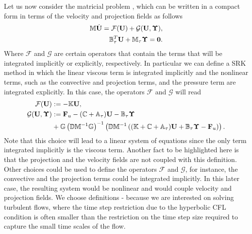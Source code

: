 Let us now consider the matricial problem , which can be written in a compact form in terms of the velocity and projection fields as follows
\begin{subequations}\label{eq-C7_SRK_ueta}
\begin{align}
\label{eq-C7_SRK_u}
\mathbb{M}\dot{{\bf U}}=\mathcal{F}({\bf U})+\mathcal{G}({\bf U},\boldsymbol{\Upsilon}),\\
\label{eq-C7_SRK_eta}
\mathbb{B}_\tau^T{\bf U}+\mathbb{M}_\tau\boldsymbol{\Upsilon}=\mathbf{0}.
\end{align}
\end{subequations}
Where $\mathcal{F}$ and $\mathcal{G}$ are certain operators that contain the terms that will be integrated implicitly or explicitly, respectively. In particular we can define a SRK method in which the linear viscous term is integrated implicitly and the nonlinear terms, such as the convective and projection terms, and the pressure term are integrated explicitly. In this case, the operators $\mathcal{F}$ and $\mathcal{G}$ will read
\begin{align}
\label{eq-C7_SRK_F}
\mathcal{F}({\bf U})&:=-\mathbb{K}{\bf U},\\
\label{eq-C7_SRK_G}
\mathcal{G}({\bf U},\boldsymbol{\Upsilon})&:={\bf F}_u-(\mathbb{C}+\mathbb{A}_\tau){\bf U}-\mathbb{B}_\tau\boldsymbol{\Upsilon}\\\nonumber
&+\mathbb{G}\left(\mathbb{D}\mathbb{M}^{-1}\mathbb{G}\right)^{-1}\left(\mathbb{D}\mathbb{M}^{-1}\left((\mathbb{K}+\mathbb{C}+\mathbb{A}_\tau){\bf U}+\mathbb{B}_\tau\boldsymbol{\Upsilon}-{\bf F}_u\right)\right).
\end{align}
Note that this choice will lead to a linear system of equations since the only term integrated implicitly is the viscous term. Another fact to be highlighted here is that the projection and the velocity fields are not coupled with this definition. Other choices could be used to define the operators $\mathcal{F}$ and $\mathcal{G}$, for instance, the convective and the projection terms could be integrated implicitly. In this later case, the resulting system would be nonlinear and would couple velocity and projection fields. We choose definitions - because we are interested on solving turbulent flows, where the time step restriction due to the hyperbolic CFL condition is often smaller than the restriction on the time step size required to capture the small time scales of the flow.


